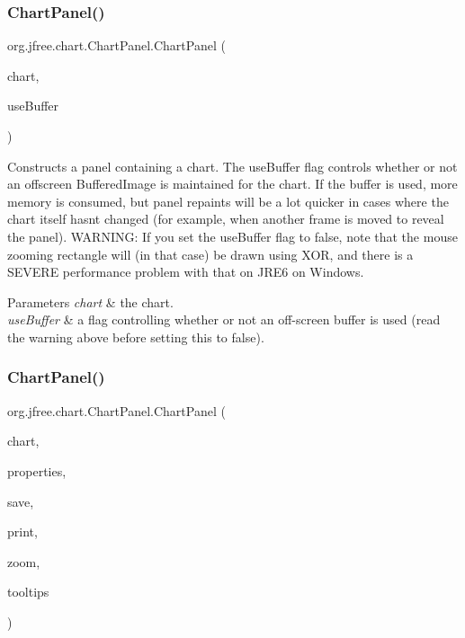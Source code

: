 \subsubsection{\texorpdfstring{Chart\+Panel()}{ChartPanel()}\hspace{0.1cm}{\footnotesize\ttfamily [2/5]}}
{\footnotesize\ttfamily org.\+jfree.\+chart.\+Chart\+Panel.\+Chart\+Panel (\begin{DoxyParamCaption}\item[{\mbox{\hyperlink{classorg_1_1jfree_1_1chart_1_1_j_free_chart}{J\+Free\+Chart}}}]{chart,  }\item[{boolean}]{use\+Buffer }\end{DoxyParamCaption})}

Constructs a panel containing a chart. The {\ttfamily use\+Buffer} flag controls whether or not an offscreen {\ttfamily Buffered\+Image} is maintained for the chart. If the buffer is used, more memory is consumed, but panel repaints will be a lot quicker in cases where the chart itself hasn\textquotesingle{}t changed (for example, when another frame is moved to reveal the panel). W\+A\+R\+N\+I\+NG\+: If you set the {\ttfamily use\+Buffer} flag to false, note that the mouse zooming rectangle will (in that case) be drawn using X\+OR, and there is a S\+E\+V\+E\+RE performance problem with that on J\+R\+E6 on Windows.


\begin{DoxyParams}{Parameters}
{\em chart} & the chart. \\
\hline
{\em use\+Buffer} & a flag controlling whether or not an off-\/screen buffer is used (read the warning above before setting this to {\ttfamily false}). \\
\hline
\end{DoxyParams}
\mbox{\label{classorg_1_1jfree_1_1chart_1_1_chart_panel_ac91baefa957a8fa5153fc65d6962fe8e}} 
\subsubsection{\texorpdfstring{Chart\+Panel()}{ChartPanel()}\hspace{0.1cm}{\footnotesize\ttfamily [3/5]}}
{\footnotesize\ttfamily org.\+jfree.\+chart.\+Chart\+Panel.\+Chart\+Panel (\begin{DoxyParamCaption}\item[{\mbox{\hyperlink{classorg_1_1jfree_1_1chart_1_1_j_free_chart}{J\+Free\+Chart}}}]{chart,  }\item[{boolean}]{properties,  }\item[{boolean}]{save,  }\item[{boolean}]{print,  }\item[{boolean}]{zoom,  }\item[{boolean}]{tooltips }\end{DoxyParamCaption})}

